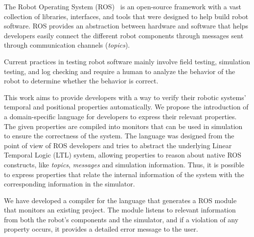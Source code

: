\documentclass[runningheads]{llncs}
\begin{document}
The Robot Operating System (ROS)~\cite{quigley2009ros} is an open-source framework with a vast collection of libraries, interfaces, and tools that were designed to help build robot software. ROS provides an abstraction between hardware and software that helps developers easily connect the different robot components through messages sent through communication channels (\textit{topics}).

Current practices in testing robot software mainly involve field testing, simulation testing, and log checking and require a human to analyze the behavior of the robot to determine whether the behavior is correct.








This work aims to provide developers with a way to verify their robotic systems' temporal and positional properties automatically. We propose the introduction of a domain-specific language for developers to express their relevant properties. The given properties are compiled into monitors that can be used in simulation to ensure the correctness of the system. The language was designed from the point of view of ROS developers and tries to abstract the underlying Linear Temporal Logic (LTL) system, allowing properties to reason about native ROS constructs, like \textit{topics}, \textit{messages} and simulation information. Thus, it is possible to express properties that relate the internal information of the system with the corresponding information in the simulator.

We have developed a compiler for the language that generates a ROS module that monitors an existing project. The module listens to relevant information from both the robot's components and the simulator, and if a violation of any property occurs, it provides a detailed error message to the user.
\end{document}
